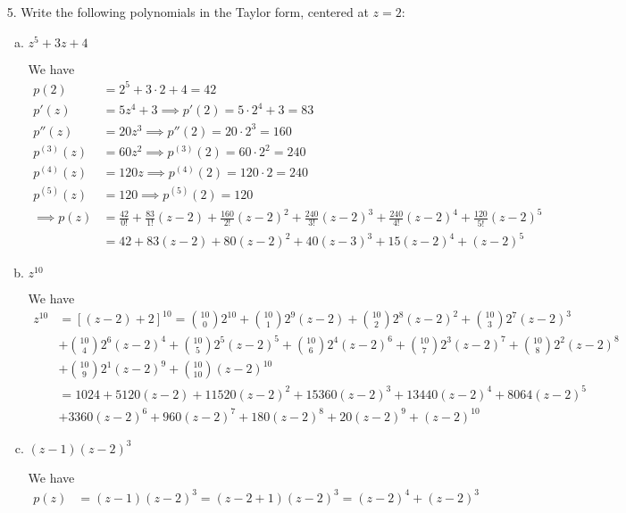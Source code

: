 \documentclass{article}
\begin{document}
\begin{itemize}
	\item[5.] Write the following polynomials in the Taylor form, centered at $z=2:$
		\begin{enumerate}[(a)]
			\item $z^5+3z+4$
				\begin{soln}
					We have
					\begin{align*}
						p(2) &= 2^5+3\cdot 2 + 4 = 42 \\
						p'(z) &= 5z^4+3\implies p'(2) = 5\cdot 2^4 + 3 = 83 \\
						p''(z) &= 20z^3 \implies p''(2) = 20\cdot 2^3 = 160 \\
						p^{(3)}(z) &= 60z^2 \implies p^{(3)}(2) = 60\cdot 2^2 = 240 \\
						p^{(4)}(z) &= 120z \implies p^{(4)}(2) = 120\cdot 2 = 240 \\
						p^{(5)}(z) &= 120 \implies p^{(5)}(2) = 120 \\
						\implies p(z) &= \frac{42}{0!} + \frac{83}{1!}(z-2) + \frac{160}{2!}(z-2)^2 + \frac{240}{3!}(z-2)^3 + \frac{240}{4!}(z-2)^4 + \frac{120}{5!}(z-2)^5 \\
						&= 42 + 83(z-2) + 80(z-2)^2 + 40(z-3)^3 + 15(z-2)^4 + (z-2)^5
					\end{align*}
				\end{soln}

			\item $z^{10}$
				\begin{soln}
					We have
					\begin{align*}
						z^{10} &= [(z-2)+2]^{10} = \binom{10}{0}2^{10} + \binom{10}{1} 2^{9}(z-2) + \binom{10}{2} 2^8(z-2)^2 + \binom{10}{3} 2^7(z-2)^3 \\
						&+ \binom{10}{4}2^6(z-2)^4 + \binom{10}{5}2^5(z-2)^5 + \binom{10}{6}2^4(z-2)^6 + \binom{10}{7}2^3(z-2)^7 + \binom{10}{8} 2^2(z-2)^8 \\
						&+ \binom{10}{9}2^1(z-2)^9 + \binom{10}{10}(z-2)^{10} \\
						&= 1024 + 5120(z-2) + 11520(z-2)^2 + 15360(z-2)^3 + 13440(z-2)^4 + 8064(z-2)^5 \\
						&+ 3360(z-2)^6 + 960(z-2)^7 + 180(z-2)^8 + 20(z-2)^9 + (z-2)^{10}
					\end{align*}
				\end{soln}

			\item $(z-1)(z-2)^3$
				\begin{soln}
					We have
					\begin{align*}
						p(z) &= (z-1)(z-2)^3 = (z-2+1)(z-2)^3 = (z-2)^4 + (z-2)^3
					\end{align*}
				\end{soln}
				

\end{enumerate}
\end{itemize}
\end{document}
